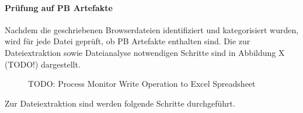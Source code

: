 \paragraph*{Prüfung auf PB Artefakte}

Nachdem die geschriebenen Browserdateien identifiziert und kategorisiert wurden, wird für jede Datei geprüft, ob PB Artefakte enthalten sind. Die zur Dateiextraktion sowie Dateianalyse notwendigen Schritte sind in Abbildung X (TODO!) dargestellt.
\begin{figure}[h!]
	\centering
	\small
	\centerline{\resizebox{\linewidth}{!}{}}
	\caption{TODO: Process Monitor Write Operation to Excel Spreadsheet}
	\label{fig:jes}
\end{figure}

Zur Dateiextraktion sind werden folgende Schritte durchgeführt.
